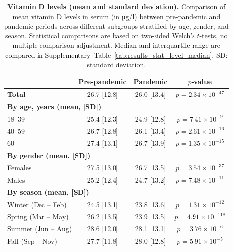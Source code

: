\documentclass[12pt]{article}
\newcommand{\REV}[1]{\textcolor{black}{#1}}
\begin{document}
\vspace{0.4cm}
\begin{table}[h]
    \centering
\caption{\textbf{Vitamin D levels (mean and standard deviation).} Comparison of mean vitamin D levels in serum (in µg/l) between pre-pandemic and pandemic periods across different subgroups stratified by age, gender, and season. Statistical comparisons are based on two-sided Welch's $t$-tests, no multiple comparison adjustment. \REV{Median and interquartile range are compared in Supplementary~Table~\ref{tab:results_stat_level_median}.} SD: standard deviation.}
\label{tab:results_stat_level_mean}
    \begin{tabular}{|l|c|c|c|}
    \hline
    \rowcolor{orange!20} & \textbf{Pre-pandemic} & \textbf{Pandemic} & \textbf{$p$-value}\\ \hline 
    \textbf{Total}& 26.7 [12.8]& 26.0 [13.4]& $p = 2.34 \times 10^{-47}$\\\hline
    \multicolumn{4}{|l|}{ \textbf{By age, years (mean, [SD])} } \\\hline
    18--39 & 25.4 [12.3]& 24.9 [12.8]& $p = 7.41 \times 10^{-9}$\\ \hline
    40--59 & 26.7 [12.8]& 26.1 [13.4]& $p = 2.61 \times 10^{-16}$	\\ \hline
    60+ & 27.4 [13.1]& 26.7 [13.9]& $p = 1.35 \times 10^{-15}$\\ \hline
    \multicolumn{4}{|l|}{ \textbf{By gender (mean, [SD])} } \\ \hline
    Females& 27.5 [13.0]& 26.7 [13.5]& $p = 3.54 \times 10^{-37}$\\ \hline
    Males& 25.2 [12.4]& 24.7 [13.2]& $p = 7.48 \times 10^{-11}$\\ \hline
    \multicolumn{4}{|l|}{\textbf{By season (mean, [SD])} } \\ \hline 
 Winter (Dec -- Feb)& 24.5 [13.1]& 23.8 [13.6]& $p = 1.31 \times 10^{-12}$
 \\ \hline 
 Spring (Mar -- May)& 26.2 [13.5]& 23.9 [13.5]& $p = 4.91 \times 10^{-118}$\\ \hline 
 Summer (Jun -- Aug)& 28.6 [12.0]& 28.1 [13.1]&$p = 3.76 \times 10^{-6}$\\ \hline 
 Fall (Sep -- Nov)& 27.7 [11.8]& 28.0 [12.8]&$p = 5.91 \times 10^{-5}$\\ \hline
\end{tabular}
\end{table}
\end{document}
